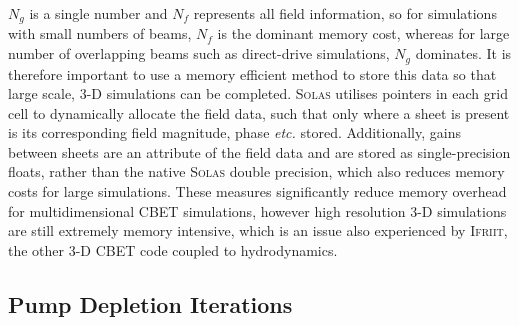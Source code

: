 $N_g$ is a single number and $N_f$ represents all field information, so for simulations with small numbers of beams, $N_f$ is the dominant memory cost, whereas for large number of overlapping beams such as direct-drive simulations, $N_g$ dominates.
It is therefore important to use a memory efficient method to store this data so that large scale, 3-D simulations can be completed.
\textsc{Solas} utilises pointers in each grid cell to dynamically allocate the field data, such that only where a sheet is present is its corresponding field magnitude, phase \textit{etc.} stored.
Additionally, gains between sheets are an attribute of the field data and are stored as single-precision floats, rather than the native \textsc{Solas} double precision, which also reduces memory costs for large simulations.
These measures significantly reduce memory overhead for multidimensional \ac{CBET} simulations, however high resolution 3-D simulations are still extremely memory intensive, which is an issue also experienced by \textsc{Ifriit}, the other 3-D \ac{CBET} code coupled to hydrodynamics.

\subsection{Pump Depletion Iterations}%
\label{sec:pump_dep_iters}

